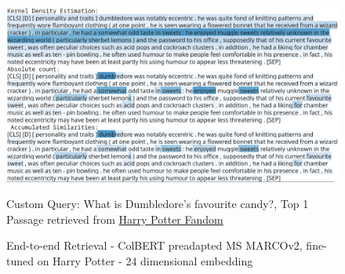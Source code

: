 \documentclass[11pt]{article}
\begin{document}
\begin{figure}[h]
    \begin{center}
    \includegraphics[width=1.0\textwidth]{"./images/sweets.png"}
    \end{center}
    \caption{End-to-end Retrieval - ColBERT preadapted MS MARCOv2, fine-tuned on Harry Potter - 24 dimensional embedding}
    \small
    \center Custom Query: What is Dumbledore's favourite candy?, Top 1 Passage retrieved from \href{https://harrypotter.fandom.com}{Harry Potter Fandom}
    \label{fig:example4}
\end{figure}
\end{document}
